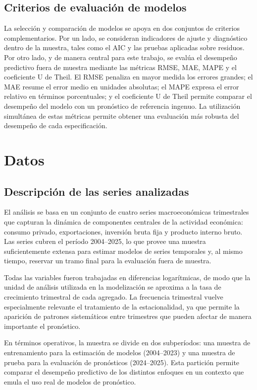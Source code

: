 \documentclass[11pt]{article}
\begin{document}
\subsection{Criterios de evaluación de modelos}

La selección y comparación de modelos se apoya en dos conjuntos de criterios complementarios. Por un lado, se consideran indicadores de ajuste y diagnóstico dentro de la muestra, tales como el AIC y las pruebas aplicadas sobre residuos. Por otro lado, y de manera central para este trabajo, se evalúa el desempeño predictivo fuera de muestra mediante las métricas RMSE, MAE, MAPE y el coeficiente U de Theil. El RMSE penaliza en mayor medida los errores grandes; el MAE resume el error medio en unidades absolutas; el MAPE expresa el error relativo en términos porcentuales; y el coeficiente U de Theil permite comparar el desempeño del modelo con un pronóstico de referencia ingenuo. La utilización simultánea de estas métricas permite obtener una evaluación más robusta del desempeño de cada especificación.

\section{Datos}

\subsection{Descripción de las series analizadas}

El análisis se basa en un conjunto de cuatro series macroeconómicas trimestrales que capturan la dinámica de componentes centrales de la actividad económica: consumo privado, exportaciones, inversión bruta fija y producto interno bruto. Las series cubren el período 2004–2025, lo que provee una muestra suficientemente extensa para estimar modelos de series temporales y, al mismo tiempo, reservar un tramo final para la evaluación fuera de muestra.

Todas las variables fueron trabajadas en diferencias logarítmicas, de modo que la unidad de análisis utilizada en la modelización se aproxima a la tasa de crecimiento trimestral de cada agregado. La frecuencia trimestral vuelve especialmente relevante el tratamiento de la estacionalidad, ya que permite la aparición de patrones sistemáticos entre trimestres que pueden afectar de manera importante el pronóstico.

En términos operativos, la muestra se divide en dos subperíodos: una muestra de entrenamiento para la estimación de modelos (2004–2023) y una muestra de prueba para la evaluación de pronósticos (2024–2025). Esta partición permite comparar el desempeño predictivo de los distintos enfoques en un contexto que emula el uso real de modelos de pronóstico.
\end{document}
